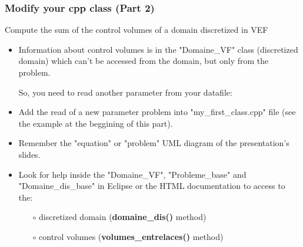 \documentclass[10pt, hyperref={unicode=true,pdfusetitle, bookmarks=true,bookmarksnumbered=false,bookmarksopen=false, breaklinks=false,pdfborder={0 0 1},backref=true,colorlinks=true,linkcolor=darkblue,pageanchor, urlcolor=darkblue}]{beamer}
\begin{document}
\begin{frame}
\frametitle{Modify your cpp class (Part 2)}
\begin{block}{Compute the sum of the control volumes of a domain discretized in VEF}
\begin{itemize}
\item Information about control volumes is in the "Domaine\_VF" class (discretized domain) which can't be accessed 
from the domain, but only from the problem. 

So, you need to read another parameter from your datafile:\\
\begin{center}
\end{center}

\item Add the read of a new parameter problem into "my\_first\_class.cpp" file (see the example at the beggining of this part).

\item Remember the "equation" or "problem" UML diagram of the presentation's slides.

\item Look for help inside the "Domaine\_VF", "Probleme\_base" and "Domaine\_dis\_base" in Eclipse or the HTML documentation to access to the:
    \begin{itemize}
    \item [$\circ$] discretized domain (\textbf{domaine\_dis()} method)
    \item [$\circ$] control volumes (\textbf{volumes\_entrelaces()} method)
    \end{itemize}
\end{itemize}

\end{block}
\end{frame}
\end{document}
